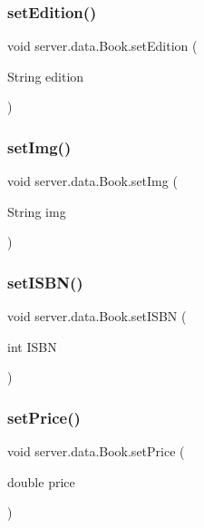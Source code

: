 \subsubsection{\texorpdfstring{set\+Edition()}{setEdition()}}
{\footnotesize\ttfamily void server.\+data.\+Book.\+set\+Edition (\begin{DoxyParamCaption}\item[{String}]{edition }\end{DoxyParamCaption})}

\mbox{\label{classserver_1_1data_1_1_book_afb3d789fa8cbb8413ccd4189533af83b}} 
\subsubsection{\texorpdfstring{set\+Img()}{setImg()}}
{\footnotesize\ttfamily void server.\+data.\+Book.\+set\+Img (\begin{DoxyParamCaption}\item[{String}]{img }\end{DoxyParamCaption})}

\mbox{\label{classserver_1_1data_1_1_book_a70559b3d9b96055ac293d0bb712f18e8}} 
\subsubsection{\texorpdfstring{set\+I\+S\+B\+N()}{setISBN()}}
{\footnotesize\ttfamily void server.\+data.\+Book.\+set\+I\+S\+BN (\begin{DoxyParamCaption}\item[{int}]{I\+S\+BN }\end{DoxyParamCaption})}

\mbox{\label{classserver_1_1data_1_1_book_a7be7befe21ce4dd863538a0c4682a4db}} 
\subsubsection{\texorpdfstring{set\+Price()}{setPrice()}}
{\footnotesize\ttfamily void server.\+data.\+Book.\+set\+Price (\begin{DoxyParamCaption}\item[{double}]{price }\end{DoxyParamCaption})}

